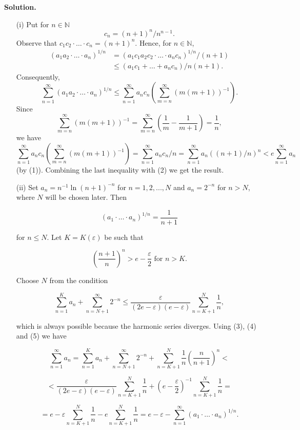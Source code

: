 \documentclass{article}
\begin{document}
\textbf{Solution.}
\begin{enumerate}
    \item[(i)] Put for \( n \in \mathbb{N} \)
    \begin{equation}
        c_n = (n + 1)^n / n^{n-1}.
    \end{equation}
    Observe that \( c_1c_2 \cdot \ldots \cdot c_n = (n + 1)^n \). Hence, for \( n \in \mathbb{N} \),
    \begin{align*}
        (a_1a_2 \cdot \ldots \cdot a_n)^{1/n} &= (a_1c_1a_2c_2 \cdot \ldots \cdot a_nc_n)^{1/n} / (n + 1) \\
        &\leq (a_1c_1 + \ldots + a_nc_n)/n(n + 1).
    \end{align*}
    Consequently,
    \begin{equation}
        \sum_{n=1}^{\infty} (a_1a_2 \cdot \ldots \cdot a_n)^{1/n} \leq \sum_{n=1}^{\infty} a_nc_n \left( \sum_{m=n}^{\infty} (m(m + 1))^{-1} \right).
    \end{equation}
    Since
    \[
        \sum_{m=n}^{\infty} (m(m + 1))^{-1} = \sum_{m=n}^{\infty} \left( \frac{1}{m} - \frac{1}{m + 1} \right) = \frac{1}{n},
    \]
    we have
    \[
        \sum_{n=1}^{\infty} a_nc_n \left( \sum_{m=n}^{\infty} (m(m + 1))^{-1} \right) = \sum_{n=1}^{\infty} a_nc_n / n = \sum_{n=1}^{\infty} a_n((n + 1)/n)^n < e \sum_{n=1}^{\infty} a_n
    \]
(by (1)). Combining the last inequality with (2) we get the result.

(ii) Set \(a_n = n^{-1} \ln(n+1)^{-n}\) for \(n = 1,2,...,N\) and \(a_n = 2^{-n}\) for \(n > N\), where \(N\) will be chosen later. Then

\begin{equation}
    (a_1 \cdot \ldots \cdot a_n)^{1/n} = \frac{1}{n+1}
\end{equation}

for \(n \leq N\). Let \(K = K(\varepsilon)\) be such that

\begin{equation}
    \left( \frac{n+1}{n} \right)^n > e - \frac{\varepsilon}{2} \text{ for } n > K.
\end{equation}

Choose \(N\) from the condition

\begin{equation}
    \sum_{n=1}^{K} a_n + \sum_{n=N+1}^{\infty} 2^{-n} \leq \frac{\varepsilon}{(2e - \varepsilon)(e - \varepsilon)} \sum_{n=K+1}^{N} \frac{1}{n},
\end{equation}

which is always possible because the harmonic series diverges. Using (3), (4) and (5) we have

\[
    \sum_{n=1}^{\infty} a_n = \sum_{n=1}^{K} a_n + \sum_{n=N+1}^{\infty} 2^{-n} + \sum_{n=K+1}^{N} \frac{1}{n} \left( \frac{n}{n+1} \right)^n <
\]

\[
    < \frac{\varepsilon}{(2e - \varepsilon)(e - \varepsilon)} \sum_{n=K+1}^{N} \frac{1}{n} + \left( e - \frac{\varepsilon}{2} \right)^{-1} \sum_{n=K+1}^{N} \frac{1}{n} =
\]

\[
    = e - \varepsilon \sum_{n=K+1}^{N} \frac{1}{n} - e \sum_{n=K+1}^{N} \frac{1}{n} = e - \varepsilon - \sum_{n=1}^{\infty} (a_1 \cdot \ldots \cdot a_n)^{1/n}.
\]

\end{enumerate}
\end{document}
